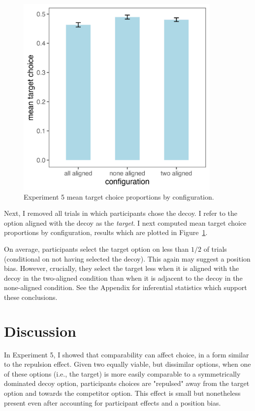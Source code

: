 \begin{figure}
   \includegraphics[width=100mm]{figures/comparability_crit_target_choice_by_config.jpeg}
   \caption{Experiment 5 mean target choice proportions by configuration.}
   \label{fig:comparability_crit_mean_target_choices}
\end{figure}

Next, I removed all trials in which participants chose the decoy. I refer to the option aligned with the decoy as the \textit{target}. I next computed mean target choice proportions by configuration, results which are plotted in Figure~\ref{fig:comparability_crit_mean_target_choices}.

On average, participants select the target option on less than $1/2$ of trials (conditional on not having selected the decoy). This again may suggest a position bias. However, crucially, they select the target less when it is aligned with the decoy in the two-aligned condition than when it is adjacent to the decoy in the none-aligned condition. See the Appendix for inferential statistics which support these conclusions.

\section{Discussion}

In Experiment 5, I showed that comparability can affect choice, in a form similar to the repulsion effect. Given two equally viable, but dissimilar options, when one of these options (i.e., the target) is more easily comparable to a symmetrically dominated decoy option, participants choices are "repulsed" away from the target option and towards the competitor option. This effect is small but nonetheless present even after accounting for participant effects and a position bias.

